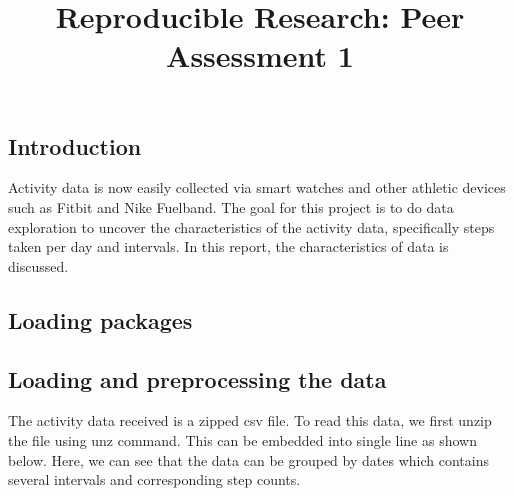 \documentclass[
]{article}
\title{Reproducible Research: Peer Assessment 1}
\author{}
\date{\vspace{-2.5em}}
\newenvironment{Shaded}{\begin{snugshade}}{\end{snugshade}}
\newcommand{\CharTok}[1]{\textcolor[rgb]{0.31,0.60,0.02}{#1}}
\newcommand{\CommentTok}[1]{\textcolor[rgb]{0.56,0.35,0.01}{\textit{#1}}}
\newcommand{\DataTypeTok}[1]{\textcolor[rgb]{0.13,0.29,0.53}{#1}}
\newcommand{\KeywordTok}[1]{\textcolor[rgb]{0.13,0.29,0.53}{\textbf{#1}}}
\newcommand{\NormalTok}[1]{#1}
\newcommand{\OperatorTok}[1]{\textcolor[rgb]{0.81,0.36,0.00}{\textbf{#1}}}
\newcommand{\OtherTok}[1]{\textcolor[rgb]{0.56,0.35,0.01}{#1}}
\newcommand{\StringTok}[1]{\textcolor[rgb]{0.31,0.60,0.02}{#1}}
\begin{document}
\maketitle

\hypertarget{introduction}{%
\subsection{Introduction}\label{introduction}}

Activity data is now easily collected via smart watches and other
athletic devices such as Fitbit and Nike Fuelband. The goal for this
project is to do data exploration to uncover the characteristics of the
activity data, specifically steps taken per day and intervals. In this
report, the characteristics of data is discussed.

\hypertarget{loading-packages}{%
\subsection{Loading packages}\label{loading-packages}}

\begin{Shaded}
\end{Shaded}

\hypertarget{loading-and-preprocessing-the-data}{%
\subsection{Loading and preprocessing the
data}\label{loading-and-preprocessing-the-data}}

The activity data received is a zipped csv file. To read this data, we
first unzip the file using unz command. This can be embedded into single
line as shown below. Here, we can see that the data can be grouped by
dates which contains several intervals and corresponding step counts.

\begin{Shaded}
\end{Shaded}
\end{document}
